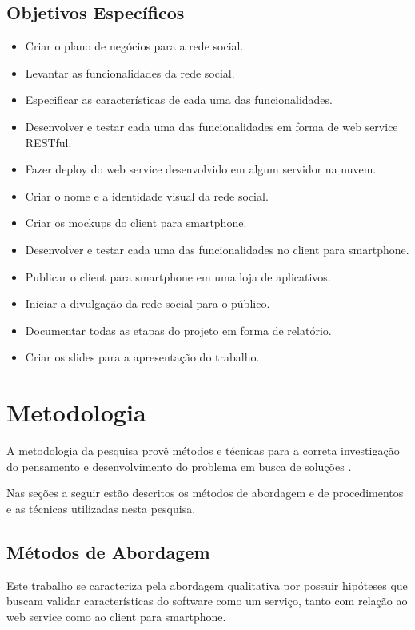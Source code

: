 \documentclass[diss]{template/setrem}
\begin{document}
\subsection{Objetivos Específicos}
\begin{itemize}
   	\item Criar o plano de negócios para a rede social.
	\item Levantar as funcionalidades da rede social.
	\item Especificar as características de cada uma das funcionalidades.
	\item Desenvolver e testar cada uma das funcionalidades em forma de web service RESTful.
	\item Fazer deploy do web service desenvolvido em algum servidor na nuvem.
	\item Criar o nome e a identidade visual da rede social.
	\item Criar os mockups do client para smartphone.
	\item Desenvolver e testar cada uma das funcionalidades no client para smartphone.
	\item Publicar o client para smartphone em uma loja de aplicativos.
	\item Iniciar a divulgação da rede social para o público.
	\item Documentar todas as etapas do projeto em forma de relatório.
	\item Criar os slides para a apresentação do trabalho.
\end{itemize}


\section{Metodologia}
A metodologia da pesquisa provê métodos e técnicas para a correta investigação do pensamento e desenvolvimento do problema em busca de soluções \citep{Oliveira2002}.

Nas seções a seguir estão descritos os métodos de abordagem e de procedimentos e as técnicas utilizadas nesta pesquisa.

\subsection{Métodos de Abordagem}
Este trabalho se caracteriza pela abordagem qualitativa por possuir hipóteses que buscam validar características do software como um serviço, tanto com relação ao web service como ao client para smartphone.
\end{document}
